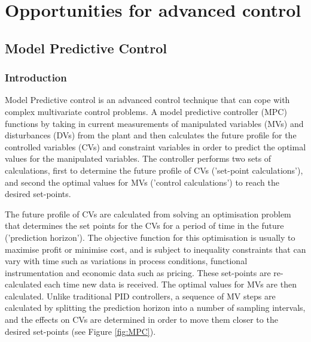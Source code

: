 \section{Opportunities for advanced control}

\subsection{Model Predictive Control}
\subsubsection{Introduction}
Model Predictive control is an advanced control technique that can cope with complex multivariate control problems. A model predictive controller (MPC) functions by taking in current measurements of manipulated variables (MVs) and disturbances (DVs) from the plant and then calculates the future profile for the controlled variables (CVs) and constraint variables in order to predict the optimal values for the manipulated variables. The controller performs two sets of calculations, first to determine the future profile of CVs ('set-point calculations'), and second the optimal values for MVs ('control calculations') to reach the desired set-points. 

The future profile of CVs are calculated from solving an optimisation problem that determines the set points for the CVs for a period of time in the future ('prediction horizon'). The objective function for this optimisation is usually to maximise profit or minimise cost, and is subject to inequality constraints that can vary with time such as variations in process conditions, functional instrumentation and economic data such as pricing. These set-points are re-calculated each time new data is received. The optimal values for MVs are then calculated. Unlike traditional PID controllers, a sequence of MV steps are calculated by splitting the prediction horizon into a number of sampling intervals, and the effects on CVs are determined in order to move them closer to the desired set-points (see Figure \ref{fig:MPC}). 

